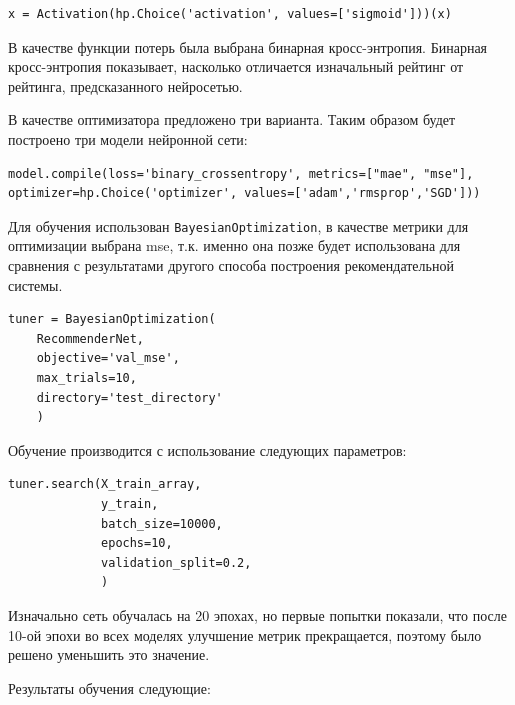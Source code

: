 \documentclass[bachelor, och, diploma]{SCWorks}
\begin{document}
\begin{verbatim}
x = Activation(hp.Choice('activation', values=['sigmoid']))(x)  
\end{verbatim}

В качестве функции потерь была выбрана бинарная кросс-энтропия. Бинарная кросс-энтропия показывает, насколько отличается
 изначальный рейтинг от рейтинга, предсказанного нейросетью. 

В качестве оптимизатора предложено три варианта. Таким образом 
будет построено три модели нейронной сети:
\begin{verbatim}
model.compile(loss='binary_crossentropy', metrics=["mae", "mse"], optimizer=hp.Choice('optimizer', values=['adam','rmsprop','SGD']))  
\end{verbatim}

Для обучения использован \verb|BayesianOptimization|, в качестве метрики для оптимизации выбрана mse, т.к. именно она позже будет использована для сравнения с результатами другого способа построения рекомендательной системы.
\begin{verbatim}
tuner = BayesianOptimization(
    RecommenderNet,                 
    objective='val_mse',                              
    max_trials=10,              
    directory='test_directory'   
    )
\end{verbatim}

Обучение производится с использование следующих параметров:

\begin{verbatim}
tuner.search(X_train_array,                  
             y_train,                  
             batch_size=10000,          
             epochs=10,                 
             validation_split=0.2,   
             )

\end{verbatim}

Изначально сеть обучалась на 20 эпохах, но первые попытки показали, что после 10-ой эпохи во всех моделях улучшение метрик прекращается, поэтому было решено уменьшить это значение.

Результаты обучения следующие: 
\end{document}
